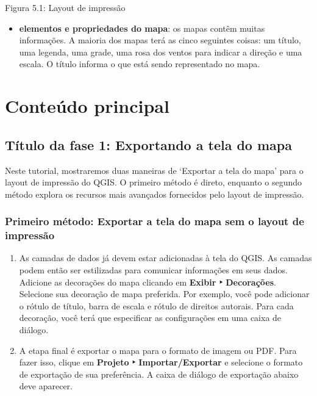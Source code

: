 \documentclass[
]{book}
\providecommand{\tightlist}{%
  \setlength{\itemsep}{0pt}\setlength{\parskip}{0pt}}
\begin{document}
Figura 5.1: Layout de impressão

\begin{itemize}
\tightlist
\item
  \textbf{elementos e propriedades do mapa}: os mapas contêm muitas informações. A maioria dos mapas terá as cinco seguintes coisas: um título, uma legenda, uma grade, uma rosa dos ventos para indicar a direção e uma escala. O título informa o que está sendo representado no mapa.
\end{itemize}

\hypertarget{conteuxfado-principal-5}{%
\section{Conteúdo principal}\label{conteuxfado-principal-5}}

\hypertarget{tuxedtulo-da-fase-1-exportando-a-tela-do-mapa}{%
\subsection{Título da fase 1: Exportando a tela do mapa}\label{tuxedtulo-da-fase-1-exportando-a-tela-do-mapa}}

Neste tutorial, mostraremos duas maneiras de `Exportar a tela do mapa' para o layout de impressão do QGIS. O primeiro método é direto, enquanto o segundo método explora os recursos mais avançados fornecidos pelo layout de impressão.

\hypertarget{primeiro-muxe9todo-exportar-a-tela-do-mapa-sem-o-layout-de-impressuxe3o}{%
\subsubsection{\texorpdfstring{\textbf{Primeiro método: Exportar a tela do mapa sem o layout de impressão}}{Primeiro método: Exportar a tela do mapa sem o layout de impressão}}\label{primeiro-muxe9todo-exportar-a-tela-do-mapa-sem-o-layout-de-impressuxe3o}}

\begin{enumerate}
\def\labelenumi{\arabic{enumi}.}
\tightlist
\item
  As camadas de dados já devem estar adicionadas à tela do QGIS. As camadas podem então ser estilizadas para comunicar informações em seus dados. Adicione as decorações do mapa clicando em \textbf{Exibir ‣ Decorações}. Selecione sua decoração de mapa preferida. Por exemplo, você pode adicionar o rótulo de título, barra de escala e rótulo de direitos autorais. Para cada decoração, você terá que especificar as configurações em uma caixa de diálogo.
\item
  A etapa final é exportar o mapa para o formato de imagem ou PDF. Para fazer isso, clique em \textbf{Projeto ‣ Importar/Exportar} e selecione o formato de exportação de sua preferência. A caixa de diálogo de exportação abaixo deve aparecer.
\end{enumerate}
\end{document}
